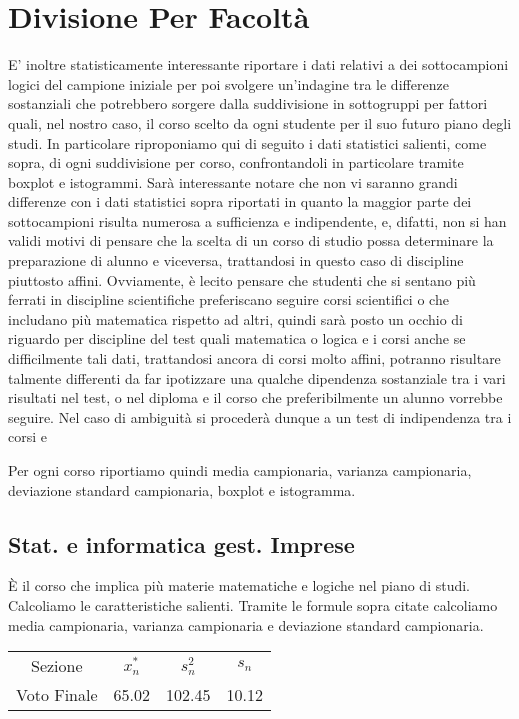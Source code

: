 \section{Divisione Per Facoltà}

E’ inoltre statisticamente interessante riportare i dati relativi a dei sottocampioni logici del campione iniziale per poi svolgere un’indagine tra le differenze sostanziali che potrebbero sorgere dalla suddivisione in sottogruppi per fattori quali, nel nostro caso, il corso scelto da ogni studente per il suo futuro piano degli studi.  In particolare riproponiamo qui di seguito i dati statistici salienti, come sopra, di ogni suddivisione per corso, confrontandoli in particolare tramite boxplot e istogrammi. Sarà interessante notare che non vi saranno grandi differenze con i dati statistici sopra riportati in quanto la maggior parte dei sottocampioni risulta numerosa a sufficienza e indipendente, e, difatti, non si han validi motivi di pensare che la scelta di un corso di studio possa determinare la preparazione di alunno e  viceversa, trattandosi in questo caso di discipline piuttosto affini. Ovviamente, è lecito pensare che studenti che si sentano più ferrati in discipline scientifiche preferiscano seguire corsi scientifici o che includano più matematica rispetto ad altri, quindi sarà posto un occhio di riguardo per discipline del test quali matematica o logica e i corsi anche se difficilmente tali dati, trattandosi ancora di corsi molto affini, potranno risultare talmente differenti da far ipotizzare una qualche dipendenza sostanziale tra i vari risultati nel test, o nel diploma e il corso che preferibilmente un alunno vorrebbe seguire.  Nel caso di ambiguità si procederà dunque a un test di indipendenza tra i corsi e 

Per ogni corso riportiamo quindi media campionaria, varianza campionaria, deviazione standard campionaria, boxplot e istogramma.
\clearpage
\thispagestyle{empty} %
\subsection{Stat. e informatica gest. Imprese}

È il corso che implica più materie matematiche e logiche  nel piano di studi.
Calcoliamo le caratteristiche salienti.
Tramite le formule sopra citate calcoliamo media campionaria, varianza campionaria e deviazione standard campionaria.

\begin{center}
\begin{tabular}{cccc}
  \toprule
  Sezione & \(x_{n}^{*}\) & \(s_n^2\) & \(s_n\) \\
  Voto Finale & 65.02 & 102.45 & 10.12 \\
  \bottomrule
\end{tabular}
\end{center}

